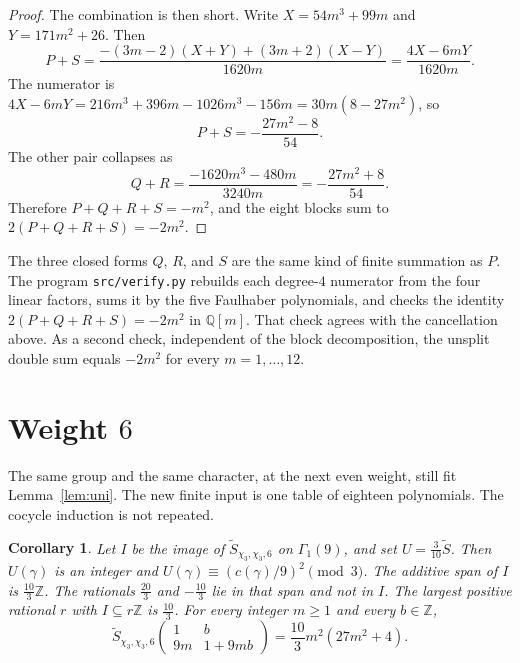 \documentclass[11pt]{article}
\newtheorem{corollary}[theorem]{Corollary}
\theoremstyle{remark}
\newcommand{\tS}{\widetilde{S}}
\newcommand{\Z}{\mathbb{Z}}
\newcommand{\Q}{\mathbb{Q}}
\begin{document}
\begin{proof}
The combination is then short.
Write \(X=54m^3+99m\) and \(Y=171m^2+26\).
Then
\[
P+S=\frac{-(3m-2)(X+Y)+(3m+2)(X-Y)}{1620m}=\frac{4X-6mY}{1620m}.
\]
The numerator is \(4X-6mY=216m^3+396m-1026m^3-156m=30m(8-27m^2)\), so
\[
P+S=-\frac{27m^2-8}{54}.
\]
The other pair collapses as
\[
Q+R=\frac{-1620m^3-480m}{3240m}=-\frac{27m^2+8}{54}.
\]
Therefore \(P+Q+R+S=-m^2\), and the eight blocks sum to \(2(P+Q+R+S)=-2m^2\).
\end{proof}

The three closed forms \(Q\), \(R\), and \(S\) are the same kind of finite summation as \(P\).
The program \texttt{src/verify.py} rebuilds each degree-\(4\) numerator from the four linear factors, sums it by the five Faulhaber polynomials, and checks the identity \(2(P+Q+R+S)=-2m^2\) in \(\Q[m]\).
That check agrees with the cancellation above.
As a second check, independent of the block decomposition, the unsplit double sum equals \(-2m^2\) for every \(m=1,\ldots,12\).

\section{Weight \(6\)}
\label{app:k6}

The same group and the same character, at the next even weight, still fit Lemma~\ref{lem:uni}.
The new finite input is one table of eighteen polynomials.
The cocycle induction is not repeated.

\begin{corollary}
\label{cor:k6}
Let \(I\) be the image of \(\tS_{\chi_3,\chi_3,6}\) on \(\Gamma_1(9)\), and set \(U=\tfrac{3}{10}\tS\).
Then \(U(\gamma)\) is an integer and \(U(\gamma)\equiv(c(\gamma)/9)^2\pmod{3}\).
The additive span of \(I\) is \(\tfrac{10}{3}\Z\).
The rationals \(\tfrac{20}{3}\) and \(-\tfrac{10}{3}\) lie in that span and not in \(I\).
The largest positive rational \(r\) with \(I\subseteq r\Z\) is \(\tfrac{10}{3}\).
For every integer \(m\ge 1\) and every \(b\in\Z\),
\begin{equation}
\label{eq:k6family}
\tS_{\chi_3,\chi_3,6}\begin{pmatrix}1&b\\9m&1+9mb\end{pmatrix}
=\frac{10}{3}m^2(27m^2+4).
\end{equation}
\end{corollary}
\end{document}
